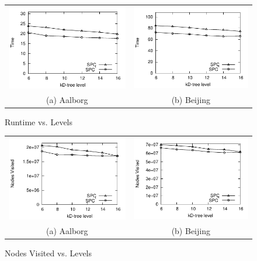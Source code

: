 \begin{figure}[htb]
\center
  \begin{tabular}{@{}c@{ }c@{}}
     \includegraphics[width=0.5\columnwidth]{figures/split_runtime_aal_server.pdf}
     &
     \includegraphics[width=0.5\columnwidth]{figures/split_runtime_bei_server.pdf}
      \\
     (a) Aalborg & (b)  Beijing
     \end{tabular}
\caption{Runtime vs. Levels}
\label{fig:levelVsruntime}
\end{figure}

\begin{figure}[htb]
\center
  \begin{tabular}{@{}c@{ }c@{}}
     \includegraphics[width=0.5\columnwidth]{figures/split_nodes_aal_server.pdf}
     &
     \includegraphics[width=0.5\columnwidth]{figures/split_nodes_bei_server.pdf}
      \\
     (a) Aalborg & (b)  Beijing
     \end{tabular}
\caption{Nodes Visited vs. Levels}
\label{fig:levelVsNodesvisited}
\end{figure}






